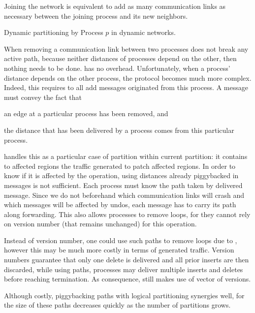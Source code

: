 \noindent Joining the network is equivalent to add as many
communication links as necessary between the joining process and its
new neighbors.

\begin{algorithm}
  
  \caption{\label{algo:edges}Dynamic partitioning by Process $p$ in dynamic networks.}
\end{algorithm}

When removing a communication link between two processes does not
break any active path, because neither distances of processes depend
on the other, then nothing needs to be done. \NAME has no overhead.
Unfortunately, when a process' distance depends on the other process,
the protocol becomes much more complex. Indeed, this requires to
 all add messages originated from this process. A message
must convey the fact that
\begin{inparaenum}[(i)]
\item an edge at a particular process has been removed, and
\item the distance that has been delivered by a process comes from
  this particular process.
\end{inparaenum}

\noindent \NAME handles this as a particular case of partition within
current partition: it contains to affected regions the traffic
generated to patch affected regions. In order to know if it is
affected by the  operation, using distances already
piggybacked in messages is not sufficient.  Each process must know the
path taken by delivered message. Since we do not beforehand which
communication links will crash and which messages will be affected by
undos, each message has to carry its path along forwarding. This also
allows processes to remove loops, for they cannot rely on version
number (that remains unchanged) for this operation.

\noindent Instead of version number, one could use such paths to remove loops
due to , however this may be much more costly in
terms of generated traffic. Version numbers guarantee that only one
delete is delivered and all prior inserts are then discarded, while
using paths, processes may deliver multiple inserts and deletes before
reaching termination.  As
consequence, \NAME still makes use of vector of versions.

\noindent Although costly, piggybacking paths with logical partitioning synergies
well, for the size of these paths decreases quickly as the number of
partitions grows.

